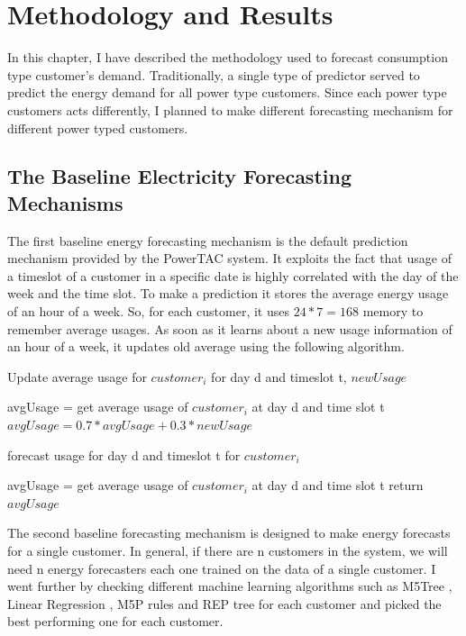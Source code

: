 
\chapter{Methodology and Results}

In this chapter, I have described the methodology used to forecast consumption type customer's demand. Traditionally, a single type of predictor served to predict the energy demand for all power type customers. Since each power type customers acts differently, I planned to make different forecasting mechanism for different power typed customers.

\section{The Baseline Electricity Forecasting Mechanisms}
The first baseline energy forecasting mechanism is the default prediction mechanism provided by the PowerTAC system. It exploits the fact that usage of a timeslot of a customer in a specific date is highly correlated with the day of the week and the time slot. To make a prediction it stores the average energy usage of an hour of a week. So, for each customer, it uses $24*7 = 168$ memory to remember average usages. As soon as it learns about a new usage information of an hour of a week, it updates old average using the following algorithm.


\begin{algorithm}
 
\caption{Update average usage for $customer_i$ for day d and timeslot t, $newUsage$}
\begin{algorithmic} [1]
\STATE avgUsage = get average usage of $customer_i$ at day d and time slot t
\STATE $avgUsage = 0.7 * avgUsage + 0.3 * newUsage$
\end{algorithmic}
\label{alg:updateAvgMovingAvg}
\end{algorithm}

\begin{algorithm}
\caption{forecast usage for day d and timeslot t for $customer_i$}
\begin{algorithmic} [1]
\STATE avgUsage = get average usage of $customer_i$ at day d and time slot t 
\STATE return $avgUsage$
\end{algorithmic}
 \label{alg:predictAvgMovingAvg}
\end{algorithm}

The second baseline forecasting mechanism is designed to make energy forecasts for a single customer. In general, if there are n customers in the system, we will need n energy forecasters each one trained on the data of a single customer. I went further by checking different machine learning algorithms such as M5Tree \cite{witten2005data}, Linear Regression \cite{witten2005data}, M5P rules \cite{witten2005data} and REP tree \cite{witten2005data} for each customer and picked the best performing one for each customer.

